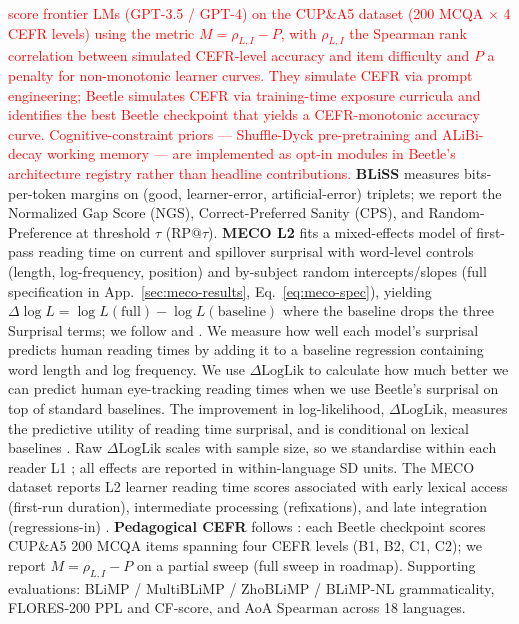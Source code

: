 \documentclass[11pt]{article}
\begin{document}
\textcolor{red}{\citet{benedetto-etal-2024-using} score frontier LMs (GPT-3.5 / GPT-4) on the CUP\&A5 dataset \citep{mullooly2023cupa5} (200 MCQA $\times$ 4 CEFR levels) using the metric $M = \rho_{L,I} - P$, with $\rho_{L,I}$ the Spearman rank correlation between simulated CEFR-level accuracy and item difficulty and $P$ a penalty for non-monotonic learner curves. They simulate CEFR via prompt engineering; Beetle simulates CEFR via training-time exposure curricula and identifies the best Beetle checkpoint that yields a CEFR-monotonic accuracy curve. Cognitive-constraint priors --- Shuffle-Dyck pre-pretraining \citep{hu2025between} and ALiBi-decay working memory \citep{mita2025wm, madhayastha2026wm} --- are implemented as opt-in modules in Beetle's architecture registry rather than headline contributions.}
\textbf{BLiSS} \citep{gao2025bliss} measures bits-per-token margins on (good, learner-error, artificial-error) triplets; we report the Normalized Gap Score (NGS), Correct-Preferred Sanity (CPS), and Random-Preference at threshold $\tau$ (RP$@\tau$). \textbf{MECO L2} fits a mixed-effects model of first-pass reading time on current and spillover surprisal with word-level controls (length, log-frequency, position) and by-subject random intercepts/slopes (full specification in App.~\ref{sec:meco-results}, Eq.~\ref{eq:meco-spec}), yielding $\Delta\log L = \log L(\text{full}) - \log L(\text{baseline})$ where the baseline drops the three Surprisal terms; we follow \citet{wilcox-etal-2023-language} and \citet{de-varda-marelli-2022-effects}. We measure how well each model's surprisal predicts human reading times by adding it to a baseline regression containing word length and log frequency.  We use  $\Delta\mathrm{LogLik}$ to calculate how much better we can predict human eye-tracking reading times when we use Beetle's surprisal on top of standard baselines.  The improvement in log-likelihood, $\Delta\mathrm{LogLik}$, measures the predictive utility of reading time surprisal, and is conditional on lexical baselines \citep{goodkind2018predictive,wilcox2020predictive, de-varda-marelli-2022-effects}. Raw $\Delta\mathrm{LogLik}$ scales with sample size, so we standardise within each reader L1 \citep{de-varda-marelli-2022-effects}; all effects are reported in within-language SD units. The MECO dataset reports L2 learner reading time scores associated with early lexical access (first-run duration), intermediate processing (refixations), and late integration (regressions-in) \citep{siegelman2025wave}. \textbf{Pedagogical CEFR} follows \citet{benedetto-etal-2024-using}: each Beetle checkpoint scores CUP\&A5 \citep{mullooly2023cupa5} 200 MCQA items spanning four CEFR levels (B1, B2, C1, C2); we report $M = \rho_{L,I} - P$ on a partial sweep (full sweep in roadmap). Supporting evaluations: BLiMP / MultiBLiMP / ZhoBLiMP / BLiMP-NL grammaticality, FLORES-200 PPL and CF-score, and AoA Spearman across 18 languages.
\end{document}
